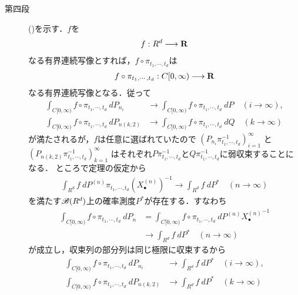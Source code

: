 \begin{sketch}
\begin{description}
			\item[第四段]
				()を示す．$f$を
				\begin{align}
					f:R^d \longrightarrow \mathbf{R}
				\end{align}
				なる有界連続写像とすれば，$f \circ \pi_{t_1,\cdots,t_d}$は
				\begin{align}
					f \circ \pi_{t_1,\cdots,t_d}:C[0,\infty) \longrightarrow \mathbf{R}
				\end{align}
				なる有界連続写像となる．従って
				\begin{align}
					\int_{C[0,\infty)} f \circ \pi_{t_1,\cdots,t_d}\ dP_{n_i}
						&\longrightarrow \int_{C[0,\infty)} f \circ \pi_{t_1,\cdots,t_d}\ dP
						\quad (i \longrightarrow \infty), 
						\label{eq:chapter_2_Theorem_4_15_3} \\
					\int_{C[0,\infty)} f \circ \pi_{t_1,\cdots,t_d}\ dP_{n(k,2)}
						&\longrightarrow \int_{C[0,\infty)} f \circ \pi_{t_1,\cdots,t_d}\ dQ
						\quad (k \longrightarrow \infty)
				\end{align}
				が満たされるが，$f$は任意に選ばれていたので
				$\left(P_{n_i}\pi_{t_1,\cdots,t_d}^{-1}\right)_{i=1}^\infty$
				と$\left(P_{n(k,2)}\pi_{t_1,\cdots,t_d}^{-1}\right)_{k=1}^\infty$
				はそれぞれ$P\pi_{t_1,\cdots,t_d}^{-1}$と$Q\pi_{t_1,\cdots,t_d}^{-1}$に弱収束することになる．
				ところで定理の仮定から
				\begin{align}
					\int_{R^d} f\ dP^{(n)}\pi_{t_1,\cdots,t_d} (X_\bullet^{(n)})^{-1}
					\longrightarrow \int_{R^d} f\ dP^*
					\quad (n \longrightarrow \infty)
					\label{eq:chapter_2_Theorem_4_15_4}
				\end{align}
				を満たす$\mathscr{B}(R^d)$上の確率測度$P^*$が存在する．すなわち
				\begin{align}
					\int_{C[0,\infty)} f \circ \pi_{t_1,\cdots,t_d}\ dP_n
					&= \int_{C[0,\infty)} f \circ \pi_{t_1,\cdots,t_d}\ dP^{(n)} {X_\bullet^{(n)}}^{-1} \\
					&\longrightarrow \int_{R^d} f\ dP^* \quad (n \longrightarrow \infty)
				\end{align}
				が成立し，収束列の部分列は同じ極限に収束するから
				\begin{align}
					\int_{C[0,\infty)} f \circ \pi_{t_1,\cdots,t_d}\ dP_{n_i}
						&\longrightarrow \int_{R^d} f\ dP^*
						\quad (i \longrightarrow \infty),
						\label{eq:chapter_2_Theorem_4_15_5} \\
					\int_{C[0,\infty)} f \circ \pi_{t_1,\cdots,t_d}\ dP_{n(k,2)}
						&\longrightarrow \int_{R^d} f\ dP^*
						\quad (k \longrightarrow \infty)

\end{align}
\end{description}
\end{sketch}
